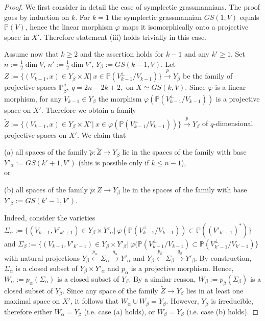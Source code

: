 \documentclass[12pt]{amsart}
\renewcommand{\phi}{\varphi}
\theoremstyle{definition}
\begin{document}
\begin{proof}
We first consider in detail the case of symplectic grassmannians.
The proof goes by induction on $k$. For $k=1$ the symplectic grassmannian
$GS(1,V)$ equals $\mathbb{P}(V)$, hence the linear morphism $\phi$ maps it isomorphically onto a projective space in
$X'$. Therefore statement (iii) holds trivially in this case.

Assume now that $k\ge2$ and the assertion holds for $k-1$ and any $k'\ge1$.
Set $n:=\frac{1}{2}\dim V$, $n':=\frac{1}{2}\dim V'$, $Y_{\beta}:=GS(k-1,V)$.
Let $Z:=\{(V_{k-1},x)\in Y_{\beta}\times X|\ x\in\mathbb{P}(V_{k-1}^\bot/V_{k-1})\}\overset{p}\to Y_{\beta}$
be the family of projective spaces $\mathbb{P}^q_\beta,\ q=2n-2k+2,$ on $X\simeq GS(k,V)$.
Since $\phi$ is a linear morphism, for any $V_{k-1}\in Y_{\beta}$ the morphism
$\phi(\mathbb{P}(V_{k-1}^\bot/V_{k-1}))$ is a projective space on $X'$.
Therefore we obtain a family
$\tilde{Z}:=\{(V_{k-1},x)\in Y_{\beta}\times X'|\ x\in\phi(\mathbb{P}(V_{k-1}^\bot/V_{k-1}))\}
\overset{\tilde{p}}\to Y_{\beta}$ of $q$-dimensional projective spaces on $X'$.
We claim that

(a) all spaces of the family $\tilde{p}:\tilde{Z}\to Y_{\beta}$ lie in the spaces of the
family with base $Y'_{\alpha}:=GS(k'+1,V')$ (this is possible only if $k\le n-1$),\\
or

(b) all spaces of the family
$\tilde{p}:\tilde{Z}\to Y_{\beta}$ lie in the spaces of the family with base $Y'_{\beta}:=GS(k'-1,V')$.


Indeed, consider the varieties $\Sigma_{\alpha}:=\{(V_{k-1},V'_{k'+1})\in Y_{\beta}\times Y'_{\alpha}|\
\phi(\mathbb{P}(V_{k-1}^\bot/V_{k-1}))\subset\mathbb{P}((V'_{k'+1})^*)\}$
and $\Sigma_{\beta}:=\{(V_{k-1},V'_{k'-1})\in Y_{\beta}\times Y'_{\beta}|\ \phi(\mathbb{P}(V_{k-1}^\bot/V_{k-1})
\subset \mathbb{P}(V_{k'-1}^\bot/V_{k'-1})\}$
with natural projections
$Y_{\beta}\overset{p_\alpha}\leftarrow\Sigma_{\alpha}\overset{q_{\alpha}}\to Y'_{\alpha}$
and
$Y_{\beta}\overset{p_\beta}\leftarrow\Sigma_{\beta}\overset{q_{\beta}}\to Y'_{\beta}$.
By construction,
$\Sigma_{\alpha}$ is a closed subset of $Y_{\beta}\times Y'_{\alpha}$ and $p_{\alpha}$ is a projective morphism. Hence,
$W_{\alpha}:=p_{\alpha}(\Sigma_{\alpha})$ is a closed subset of $Y_{\beta}$. By a similar reason,
$W_{\beta}:=p_{\beta}(\Sigma_{\beta})$ is a closed subset of $Y_{\beta}$. Since any space of the family
$\tilde{Z}\to Y_{\beta}$ lies
in at least one maximal space on $X'$, it follows that $W_{\alpha}\cup W_{\beta}=Y_{\beta}$. However, $Y_{\beta}$ is
irreducible, therefore either $W_{\alpha}=Y_{\beta}$ (i.e. case (a) holds), or
$W_{\beta}=Y_{\beta}$ (i.e. case (b) holds).



\end{proof}
\end{document}
